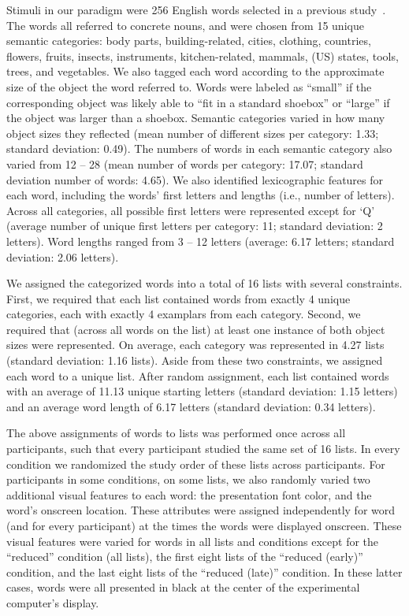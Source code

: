 \documentclass[11pt]{article}
\begin{document}
Stimuli in our paradigm were 256 English words selected in a previous
study~\citep{ZimaEtal18}. The words all referred to concrete nouns, and were
chosen from 15 unique semantic categories: body parts, building-related,
cities, clothing, countries, flowers, fruits, insects, instruments,
kitchen-related, mammals, (US) states, tools, trees, and vegetables. We also
tagged each word according to the approximate size of the object the word
referred to. Words were labeled as ``small'' if the corresponding object was
likely able to ``fit in a standard shoebox'' or ``large'' if the object was
larger than a shoebox. Semantic categories varied in how many object sizes they
reflected (mean number of different sizes per category: 1.33; standard
deviation: 0.49). The numbers of words in each semantic category also varied
from 12 -- 28 (mean number of words per category: 17.07; standard deviation
number of words: 4.65). We also identified lexicographic features for each
word, including the words' first letters and lengths (i.e., number of letters).
Across all categories, all possible first letters were represented except for
`Q' (average number of unique first letters per category: 11; standard
deviation: 2 letters). Word lengths ranged from 3 -- 12 letters (average: 6.17
letters; standard deviation: 2.06 letters).

We assigned the categorized words into a total of 16 lists with several
constraints. First, we required that each list contained words from exactly 4
unique categories, each with exactly 4 examplars from each category. Second, we
required that (across all words on the list) at least one instance of both
object sizes were represented. On average, each category was represented in
4.27 lists (standard deviation: 1.16 lists). Aside from these two constraints,
we assigned each word to a unique list. After random assignment, each list
contained words with an average of 11.13 unique starting letters (standard
deviation: 1.15 letters) and an average word length of 6.17 letters (standard
deviation: 0.34 letters).

The above assignments of words to lists was performed once across all
participants, such that every participant studied the same set of 16 lists. In
every condition we randomized the study order of these lists across
participants. For participants in some conditions, on some lists, we also
randomly varied two additional visual features to each word: the presentation
font color, and the word's onscreen location. These attributes were assigned
independently for word (and for every participant) at the times the words were
displayed onscreen. These visual features were varied for words in all lists
and conditions except for the ``reduced'' condition (all lists), the first
eight lists of the ``reduced (early)'' condition, and the last eight lists of
the ``reduced (late)'' condition. In these latter cases, words were all
presented in black at the center of the experimental computer's display.
\end{document}
